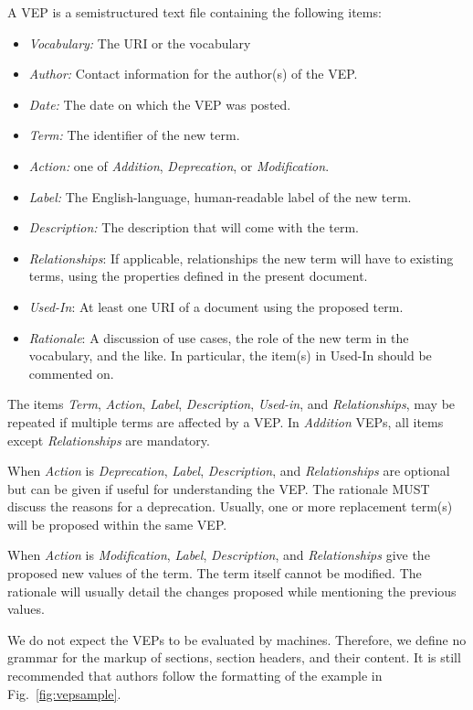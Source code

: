 \documentclass[11pt,a4paper]{ivoa}
\newcommand{\vepitem}[1]{\emph{#1}}
\begin{document}
A VEP is a semistructured text file containing the following items:

\begin{itemize}
\item \vepitem{Vocabulary:} The URI or the vocabulary
\item \vepitem{Author:}  Contact information for the author(s) of
the VEP.
\item \vepitem{Date:} The date on which the VEP was posted.
\item \vepitem{Term:} The identifier of the new term.
\item \vepitem{Action:} one of \textit{Addition}, \textit{Deprecation}, or
\textit{Modification}.
\item \vepitem{Label:} The English-language, human-readable label of the new term.
\item \vepitem{Description:} The description that will come with the term.
\item \vepitem{Relationships}: If applicable, relationships the new
term will have to existing terms, using the properties defined in
the present document.
\item \vepitem{Used-In}: At least one URI of a document using the
proposed term.
\item \vepitem{Rationale}: A discussion of use cases, the role of the new term in
the vocabulary, and the like.  In particular, the item(s) in Used-In
should be commented on.
\end{itemize}

The items \vepitem{Term}, \vepitem{Action}, \vepitem{Label},
\vepitem{Description}, \vepitem{Used-in}, 
and \vepitem{Relationships},  may be repeated if
multiple terms are affected by a VEP.  In \textit{Addition} VEPs, all items
except \vepitem{Relationships} are mandatory.

When \vepitem{Action} is \textit{Deprecation}, \vepitem{Label},
\vepitem{Description}, and \vepitem{Relationships} are optional but can be
given if useful for understanding the VEP.  The rationale MUST discuss
the reasons for a deprecation.  Usually, one or more replacement
term(s) will be proposed within the same VEP.

When \vepitem{Action} is \textit{Modification}, \vepitem{Label},
\vepitem{Description}, and \vepitem{Relationships} give the proposed new
values of the term.  The term itself cannot be modified.  The rationale
will usually detail the changes proposed while mentioning the previous 
values.

We do not expect the VEPs to be evaluated by machines.  Therefore, we
define no grammar for the markup of sections, section headers, and their
content.  It is still recommended that authors follow the formatting of
the example in Fig.~\ref{fig:vepsample}.
\end{document}
